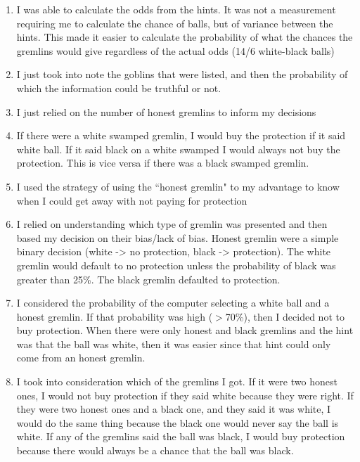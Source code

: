 \documentclass[12pt,a4paper]{article}
\begin{document}
\begin{appendices}
\begin{enumerate}
\item I was able to calculate the odds from the hints. It was not a measurement requiring me to calculate the chance of balls, but of variance between the hints. This made it easier to calculate the probability of what the chances the gremlins would give regardless of the actual odds (14/6 white-black balls)

\item I just took into note the goblins that were listed, and then the probability of which the information could be truthful or not.

\item I just relied on the number of honest gremlins to inform my decisions

\item If there were a white swamped gremlin, I would buy the protection if it said white ball. If it said black on a white swamped I would always not buy the protection. This is vice versa if there was a black swamped gremlin.

\item I used the strategy of using the ``honest gremlin" to my advantage to know when I could get away with not paying for protection

\item I relied on understanding which type of gremlin was presented and then based my decision on their bias/lack of bias. Honest gremlin were a simple binary decision (white -> no protection, black -> protection). The white gremlin would default to no protection unless the probability of black was greater than 25\%. The black gremlin defaulted to protection.

\item I considered the probability of the computer selecting a white ball and a honest gremlin. If that probability was high ($>$70\%), then I decided not to buy protection. When there were only honest and black gremlins and the hint was that the ball was white, then it was easier since that hint could only come from an honest gremlin.

\item I took into consideration which of the gremlins I got. If it were two honest ones, I would not buy protection if they said white because they were right. If they were two honest ones and a black one, and they said it was white, I would do the same thing because the black one would never say the ball is white. If any of the gremlins said the ball was black, I would buy protection because there would always be a chance that the ball was black.


\end{enumerate}
\end{appendices}
\end{document}
